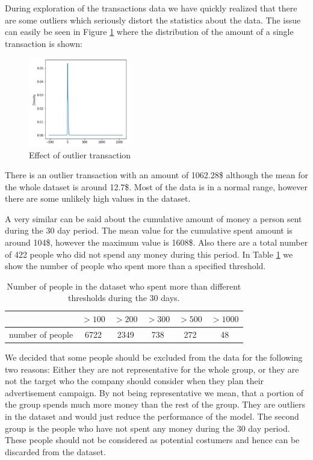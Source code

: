 During exploration of the transactions data we have quickly realized that there are some outliers which seriously distort the statistics about the data. The issue can easily be seen in Figure \ref{fig7} where the distribution of the amount of a single transaction is shown:
\begin{figure}[h]
	\centering
	\includegraphics[width=0.4\textwidth]{fig/transaction_distribution_1.jpg}
	\vspace*{-0.1in}
	\caption{Effect of outlier transaction}
	\label{fig7}
	\vspace*{-0.2in}
	\bigskip
\end{figure}

There is an outlier transaction with an amount of 1062.28\$ although the mean for the whole dataset is around 12.7\$. Most of the data is in a normal range, however there are some unlikely high values in the dataset.

A very similar can be said about the cumulative amount of money a person sent during the 30 day period. The mean value for the cumulative spent amount is around 104\$, however the maximum value is 1608\$. Also there are a total number of 422 people who did not spend any money during this period. In Table \ref{table1} we show the number of people who spent more than a specified threshold.

\begin{table}[h] \label{table1}
	\begin{center}
	\begin{tabular}{ c | c | c | c | c | c | }
		& $>100$ & $>200$ & $>300$ & $>500$ & $>1000$\\
		\hline
		number of people & 6722 & 2349 & 738 & 272 & 48 \\
		\hline  
	\end{tabular}
	\end{center}
	\caption{Number of people in the dataset who spent more than different thresholds during the 30 days.}
\end{table}

We decided that some people should be excluded from the data for the following two reasons:
Either they are not representative for the whole group, or they are not the target who the company should consider when they plan their advertisement campaign. By not being representative we mean, that a portion of the group spends much more money than the rest of the group. They are outliers in the dataset and would just reduce the performance of the model. The second group is the people who have not spent any money during the 30 day period. These people should not be considered as potential costumers and hence can be discarded from the dataset. 

